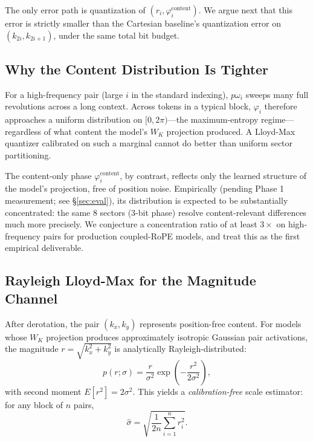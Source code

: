 \documentclass[10pt,twocolumn]{article}
\begin{document}
The only error path is quantization of $(r_i,\varphi^{\text{content}}_i)$. We argue next that this error is strictly smaller than the Cartesian baseline's quantization error on $(k_{2i},k_{2i+1})$, under the same total bit budget.

\subsection{Why the Content Distribution Is Tighter}
\label{sec:tighter}

For a high-frequency pair (large $i$ in the standard indexing), $p\omega_i$ sweeps many full revolutions across a long context. Across tokens in a typical block, $\varphi_i$ therefore approaches a uniform distribution on $[0,2\pi)$---the maximum-entropy regime---regardless of what content the model's $W_K$ projection produced. A Lloyd-Max quantizer calibrated on such a marginal cannot do better than uniform sector partitioning.

The content-only phase $\varphi^{\text{content}}_i$, by contrast, reflects only the learned structure of the model's projection, free of position noise. Empirically (pending Phase 1 measurement; see \S\ref{sec:eval}), its distribution is expected to be substantially concentrated: the same 8 sectors (3-bit phase) resolve content-relevant differences much more precisely. We conjecture a concentration ratio of at least $3\times$ on high-frequency pairs for production coupled-RoPE models, and treat this as the first empirical deliverable.

\subsection{Rayleigh Lloyd-Max for the Magnitude Channel}
\label{sec:rayleigh}

After derotation, the pair $(k_x, k_y)$ represents position-free content. For models whose $W_K$ projection produces approximately isotropic Gaussian pair activations, the magnitude $r = \sqrt{k_x^2 + k_y^2}$ is analytically Rayleigh-distributed:
\begin{equation}
p(r;\sigma) = \frac{r}{\sigma^2}\exp\!\left(-\frac{r^2}{2\sigma^2}\right),
\end{equation}
with second moment $E[r^2] = 2\sigma^2$. This yields a \emph{calibration-free} scale estimator: for any block of $n$ pairs,
\begin{equation}
\hat\sigma = \sqrt{\frac{1}{2n}\sum_{i=1}^{n} r_i^2}.
\end{equation}
\end{document}
